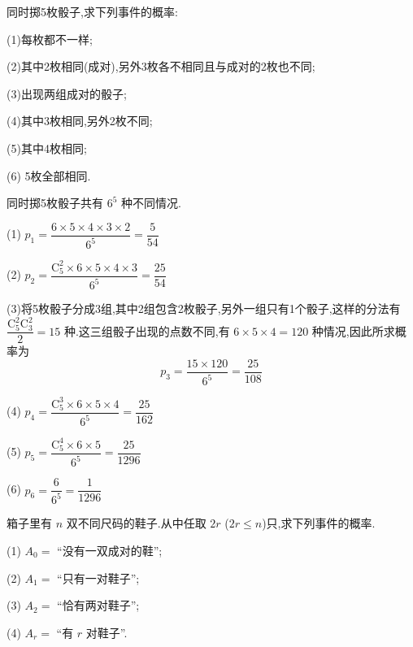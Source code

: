 \question 同时掷5枚骰子,求下列事件的概率:

(1)每枚都不一样;

(2)其中2枚相同(成对),另外3枚各不相同且与成对的2枚也不同;

(3)出现两组成对的骰子;

(4)其中3枚相同,另外2枚不同;

(5)其中4枚相同;

(6) 5枚全部相同.

\begin{solution}
    同时掷5枚骰子共有 $6^5$ 种不同情况.

    \vspace{0.3em}

    (1) $p_1 = \dfrac{6 \times 5 \times 4 \times 3 \times 2}{6^5} = \dfrac{5}{54}$

    \vspace{0.3em}

    (2) $p_2 = \dfrac{\mathrm{C}_5^2 \times 6 \times 5 \times 4 \times 3}{6^5} = \dfrac{25}{54}$

    \vspace{0.3em}

    (3)将5枚骰子分成3组,其中2组包含2枚骰子,另外一组只有1个骰子,这样的分法有 $\dfrac{\mathrm{C}_5^2 \mathrm{C}_3^2}{2} = 15$ 种.这三组骰子出现的点数不同,有 $6 \times 5 \times 4 = 120$ 种情况,因此所求概率为
    $$
    p_3 = \dfrac{15 \times 120}{6^5} = \dfrac{25}{108}
    $$

    (4) $p_4 = \dfrac{\mathrm{C}_5^3 \times 6 \times 5 \times 4}{6^5} = \dfrac{25}{162}$

    \vspace{0.3em}

    (5) $p_5 = \dfrac{\mathrm{C}_5^4 \times 6 \times 5}{6^5} = \dfrac{25}{1296}$

    (6) $p_6 = \dfrac{6}{6^5} = \dfrac{1}{1296}$
\end{solution}

\question 箱子里有 $n$ 双不同尺码的鞋子.从中任取 $2r$ ($2r \leqslant n$)只,求下列事件的概率.

(1) $A_0=$ ``没有一双成对的鞋'';

(2) $A_1=$ ``只有一对鞋子'';

(3) $A_2=$ ``恰有两对鞋子'';

(4) $A_r=$ ``有 $r$ 对鞋子''.

